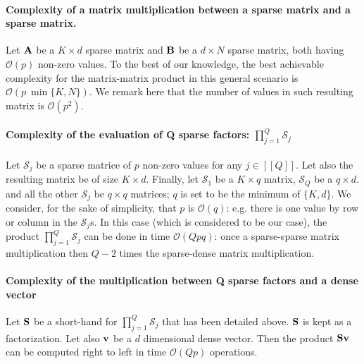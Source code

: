 \paragraph{Complexity of a matrix multiplication between a sparse matrix and a sparse matrix.}
Let ${\mathbf{A}}$ be a $K \times d $ sparse matrix and ${\mathbf{B}}$ be a $d \times N$ sparse matrix, both having $\mathcal{O}(p)$ non-zero values.
To the best of our knowledge, the best achievable complexity for the matrix-matrix product in this general scenario is $\mathcal{O}(p~\min{\{K, N\}})$. We remark here that the number of values in such resulting matrix is $\mathcal{O}(p^2)$.

\paragraph{Complexity of the evaluation of Q sparse factors: $\prod_{j=1}^{Q}\mathcal{S}_j$}
Let $\mathcal{S}_j$ be a sparse matrice of $p$ non-zero values for any $j \in [\![Q]\!]$. Let also the resulting matrix be of size $K \times d$.  Finally, let $\mathcal{S}_1$ be a $K \times q$ matrix, $\mathcal{S}_Q$ be a $q \times d$. and all the other $\mathcal{S}_j$ be $q \times q$ matrices; $q$ is set to be the minimum of $\{K, d\}$. We consider, for the sake of simplicity, that $p$ is $\mathcal{O}(q)$: e.g. there is one value by row or column in the $\mathcal{S}_j$s. In this case (which is considered to be our case), the product $\prod_{j=1}^{Q}\mathcal{S}_j$ can be done in time $\mathcal{O}(Qpq)$: once a sparse-sparse matrix multiplication then $Q-2$ times the sparse-dense matrix multiplication.

\paragraph{Complexity of the multiplication between Q sparse factors and a dense vector}
Let ${\mathbf{S}}$ be a short-hand for $\prod_{j=1}^{Q}\mathcal{S}_j$ that has been detailed above. ${\mathbf{S}}$ is kept as a factorization. Let also ${\mathbf{v}}$ be a $d$ dimensional dense vector. Then the product ${\mathbf{S}} {\mathbf{v}}$ can be computed right to left in time $\mathcal{O}(Qp)$ operations.

